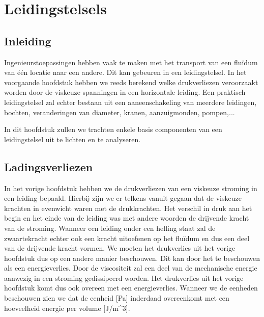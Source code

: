 \chapter{Leidingstelsels}
\label{sec:Leidingstelsels}

	\section{Inleiding}
	\label{sec:Leidingstelsels Inleiding}
Ingenieurstoepassingen hebben vaak te maken met het transport van een fluïdum van één locatie naar een andere. Dit kan gebeuren in een leidingstelsel. In het voorgaande hoofdstuk hebben we reeds berekend welke drukverliezen veroorzaakt worden door de viskeuze spanningen in een horizontale leiding. Een praktisch leidingstelsel zal echter bestaan uit een aaneenschakeling van meerdere leidingen, bochten, veranderingen van diameter, kranen, aanzuigmonden, pompen,...

In dit hoofdstuk zullen we trachten enkele basis componenten van een leidingstelsel uit te lichten en te analyseren.

	\section{Ladingsverliezen}
	\label{sec:Ladingsverliezen}
In het vorige hoofdstuk hebben we de drukverliezen van een viskeuze stroming in een leiding bepaald. Hierbij zijn we er telkens vanuit gegaan dat de viskeuze krachten in evenwicht waren met de drukkrachten. Het verschil in druk aan het begin en het einde van de leiding was met andere woorden de drijvende kracht van de stroming. Wanneer een leiding onder een helling staat zal de zwaartekracht echter ook een kracht uitoefenen op het fluïdum en dus een deel van de drijvende kracht vormen. We moeten het drukverlies uit het vorige hoofdstuk dus op een andere manier beschouwen. Dit kan door het te beschouwen als een energieverlies. Door de viscositeit zal een deel van de mechanische energie aanwezig in een stroming gedissipeerd worden. Het drukverlies uit het vorige hoofdstuk komt dus ook overeen met een energieverlies. Wanneer we de eenheden beschouwen zien we dat de eenheid [\unit{}{Pa}] inderdaad overeenkomt met een hoeveelheid energie per volume [\unit{}{J/m^3}].

